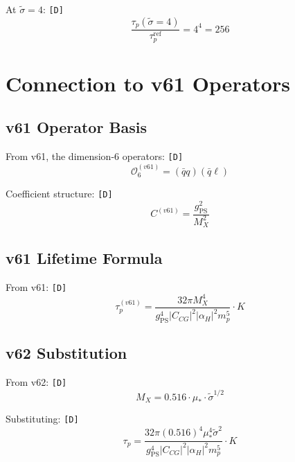 \documentclass[11pt,a4paper]{article}
\newcommand{\tagD}{\textcolor{green!50!black}{\texttt{[D]}}}
\theoremstyle{definition}
\begin{document}
At $\tilde{\sigma} = 4$: \tagD{}
\begin{equation}
\label{eq:enhance-4}
\frac{\tau_p(\tilde{\sigma}=4)}{\tau_p^{\text{ref}}} = 4^4 = 256
\end{equation}

\section{Connection to v61 Operators}
\label{app:v61-connection}

\subsection{v61 Operator Basis}
\label{app:v61-operators}

From v61, the dimension-6 operators: \tagD{}
\begin{equation}
\label{eq:v61-O6}
\mathcal{O}_6^{(v61)} = (\bar{q}q)(\bar{q}\ell)
\end{equation}

Coefficient structure: \tagD{}
\begin{equation}
\label{eq:v61-coeff}
C^{(v61)} = \frac{g_{\text{PS}}^2}{M_X^2}
\end{equation}

\subsection{v61 Lifetime Formula}
\label{app:v61-lifetime}

From v61: \tagD{}
\begin{equation}
\label{eq:v61-taup}
\tau_p^{(v61)} = \frac{32\pi M_X^4}{g_{\text{PS}}^4 |C_{CG}|^2 |\alpha_H|^2 m_p^5} \cdot K
\end{equation}

\subsection{v62 Substitution}
\label{app:v62-subst}

From v62: \tagD{}
\begin{equation}
\label{eq:v62-mx}
M_X = 0.516 \cdot \mu_* \cdot \tilde{\sigma}^{1/2}
\end{equation}

Substituting: \tagD{}
\begin{equation}
\label{eq:taup-v61-v62}
\tau_p = \frac{32\pi (0.516)^4 \mu_*^4 \tilde{\sigma}^2}{g_{\text{PS}}^4 |C_{CG}|^2 |\alpha_H|^2 m_p^5} \cdot K
\end{equation}
\end{document}
